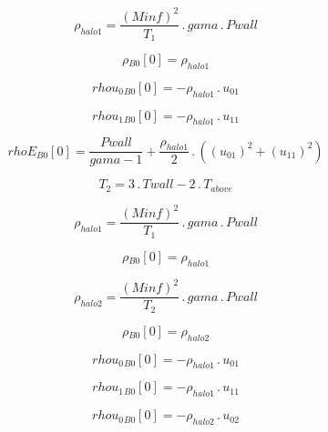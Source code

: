 \documentclass{article}
\begin{document}
\begin{dmath}\rho_{halo 1} = \frac{\left(Minf \right)^{2}}{T_{1}} \,.\, gama \,.\, Pwall\end{dmath}

\begin{dmath}{\rho{_{B0}}}[{0}] = \rho_{halo 1}\end{dmath}

\begin{dmath}{rhou_{0}{_{B0}}}[{0}] = - \rho_{halo 1} \,.\, u_{01}\end{dmath}

\begin{dmath}{rhou_{1}{_{B0}}}[{0}] = - \rho_{halo 1} \,.\, u_{11}\end{dmath}

\begin{dmath}{rhoE{_{B0}}}[{0}] = \frac{Pwall}{gama - 1} + \frac{\rho_{halo 1}}{2} \,.\, \left(\left(u_{01} \right)^{2} + \left(u_{11} \right)^{2}\right)\end{dmath}

\begin{dmath}T_{2} = 3 \,.\, Twall - 2 \,.\, T_{above}\end{dmath}

\begin{dmath}\rho_{halo 1} = \frac{\left(Minf \right)^{2}}{T_{1}} \,.\, gama \,.\, Pwall\end{dmath}

\begin{dmath}{\rho{_{B0}}}[{0}] = \rho_{halo 1}\end{dmath}

\begin{dmath}\rho_{halo 2} = \frac{\left(Minf \right)^{2}}{T_{2}} \,.\, gama \,.\, Pwall\end{dmath}

\begin{dmath}{\rho{_{B0}}}[{0}] = \rho_{halo 2}\end{dmath}

\begin{dmath}{rhou_{0}{_{B0}}}[{0}] = - \rho_{halo 1} \,.\, u_{01}\end{dmath}

\begin{dmath}{rhou_{1}{_{B0}}}[{0}] = - \rho_{halo 1} \,.\, u_{11}\end{dmath}

\begin{dmath}{rhou_{0}{_{B0}}}[{0}] = - \rho_{halo 2} \,.\, u_{02}\end{dmath}
\end{document}
